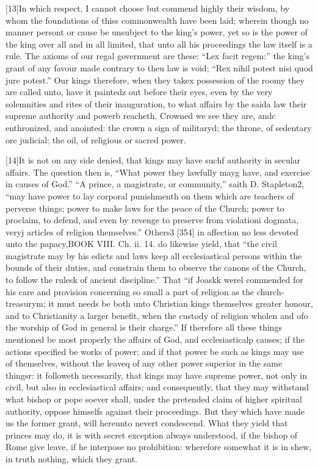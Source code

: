 [13]In which respect, I cannot choose but commend highly their wisdom, by whom the foundations of thiss commonwealth have been laid; wherein though no manner persont or cause be unsubject to the king’s power, yet so is the power of the king over all and in all limited, that unto all his proceedings the law itself is a rule. The axioms of our regal government are these: “Lex facit regem:” the king’s grant of any favour made contrary to theu law is void; “Rex nihil potest nisi quod jure potest.” Our kings therefore, when they takex possession of the roomy they are called unto, have it paintedz out before their eyes, even by the very solemnities and rites of their inauguration, to what affairs by the saida law their supreme authority and powerb reacheth. Crowned we see they are, andc enthronized, and anointed: the crown a sign of militaryd; the throne, of sedentary ore judicial; the oil, of religious or sacred power.

[14]It is not on any side denied, that kings may have suchf authority in secular affairs. The question then is, “What power they lawfully mayg have, and exercise in causes of God.” “A prince, a magistrate, or community,” saith D. Stapleton2, “may have power to lay corporal punishmenth on them which are teachers of perverse things; power to make laws for the peace of the Church; power to proclaim, to defend, and even by revenge to preserve from violationi dogmata, veryj articles of religion themselves.” Others3 [354] in affection no less devoted unto the papacy,BOOK VIII. Ch. ii. 14. do likewise yield, that “the civil magistrate may by his edicts and laws keep all ecclesiastical persons within the bounds of their duties, and constrain them to observe the canons of the Church, to follow the rulesk of ancient discipline.” That “if Joaskk werel commended for his care and provision concerning so small a part of religion as the church-treasurym; it must needs be both unto Christian kings themselves greater honour, and to Christianity a larger benefit, when the custody of religion wholen and ofo the worship of God in general is their charge.” If therefore all these things mentioned be most properly the affairs of God, and ecclesiasticalp causes; if the actions specified be works of power; and if that power be such as kings may use of themselves, without the leaveq of any other power superior in the same thingsr: it followeth necessarily, that kings may have supreme power, not only in civil, but also in ecclesiastical affairs; and consequently, that they may withstand what bishop or pope soever shall, under the pretended claim of higher spiritual authority, oppose himselfs against their proceedings. But they which have made us the former grant, will hereunto nevert condescend. What they yield that princes may do, it is with secret exception always understood, if the bishop of Rome give leave, if he interpose no prohibition: wherefore somewhat it is in shew, in truth nothing, which they grant.

